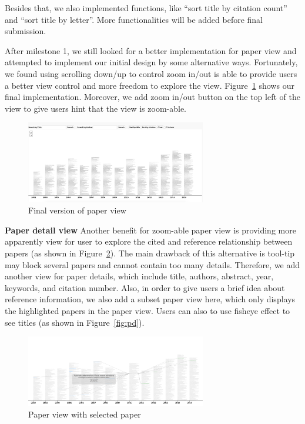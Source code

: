 Besides that, we also implemented functions, like ``sort title by citation count'' and ``sort title by letter''. More functionalities will be added before final submission.

After milestone 1, we still looked for a better implementation for paper view and attempted to implement our initial design by some alternative ways. Fortunately, we found using scrolling down/up to control zoom in/out is able to provide users a better view control and more freedom to explore the view. Figure~\ref{fig:pv_final} shows our final implementation. Moreover, we add zoom in/out button on the top left of the view to give users hint that the view is zoom-able. 

\begin{figure}[ht]			
	\centering
	\includegraphics[width=0.7\textwidth]{paper_view_final}
	\caption{Final version of paper view}
	\label{fig:pv_final}
\end{figure} 

\textbf{Paper detail view}
Another benefit for zoom-able paper view is providing more apparently view for user to explore the cited and reference relationship between papers (as shown in Figure~\ref{fig:pv_link}). The main drawback of this alternative is tool-tip may block several papers and cannot contain too many details. Therefore, we add another view for paper details, which include title, authors, abstract, year, keywords, and citation number. Also, in order to give users a brief idea about reference information, we also add a subset paper view here, which only displays the highlighted papers in the paper view. Users can also to use fisheye effect to see titles (as shown in Figure~\ref{fig:pd}).

\begin{figure}[ht]			
	\centering
	\includegraphics[width=0.7\textwidth]{paper_view_link}
	\caption{Paper view with selected paper}
	\label{fig:pv_link}
\end{figure}

